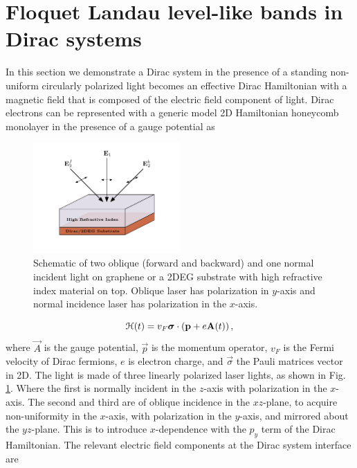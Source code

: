 \section{Floquet Landau level-like bands in Dirac systems}
In this section we demonstrate a Dirac system in the presence of a standing non-uniform circularly polarized light becomes an effective Dirac Hamiltonian with a magnetic field that is composed of the electric field component of light.
Dirac electrons can be represented with a generic model 2D Hamiltonian honeycomb monolayer in the presence of a gauge potential as

\begin{figure}
  \includegraphics[width=0.5\textwidth]{./figures/fll-setup.pdf}
  \caption{Schematic of two oblique (forward and backward) and one normal incident light on graphene or a 2DEG substrate with high refractive index material on top. Oblique laser has polarization in $y$-axis and normal incidence laser has polarization in the $x$-axis.}
  \label{fig:fll-setup}
\end{figure}

\begin{equation}\label{eq:HDirac}
  \mathcal{H}(t) = v_{F} \bm{\sigma} \cdot \left(\mathbf{p} + e\mathbf{A}(t)\right),
\end{equation}
where $\vec{A}$ is the gauge potential, $\vec{p}$ is the momentum operator, $v_F$ is the Fermi velocity of Dirac fermions, $e$ is electron charge, and $\vec{\sigma}$ the Pauli matrices vector in 2D.
The light is made of three linearly polarized laser lights, as shown in Fig. \ref{fig:fll-setup}.
Where the first is normally incident in the $z$-axis with polarization in the $x$-axis.
The second and third are of oblique incidence in the $xz$-plane, to acquire non-uniformity in the $x$-axis, with polarization in the $y$-axis, and mirrored about the $yz$-plane.
This is to introduce $x$-dependence with the $p_y$ term of the Dirac Hamiltonian.
The relevant electric field components at the Dirac system interface are

